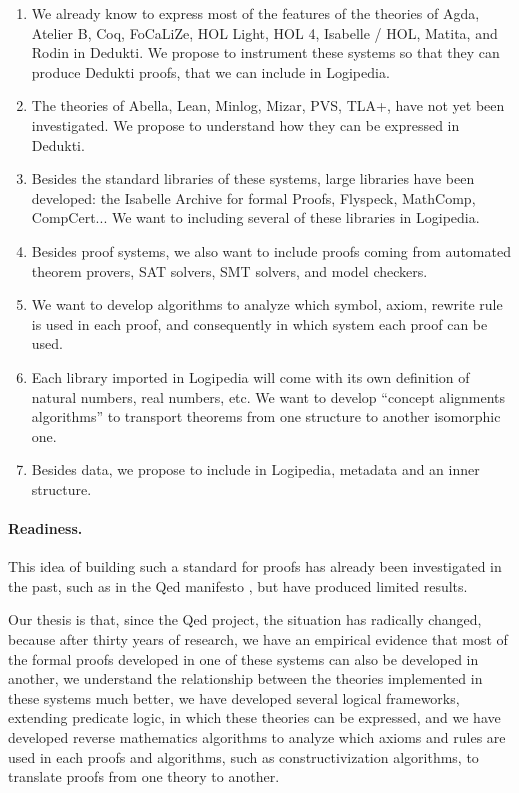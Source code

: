 \begin{enumerate}
\item 
  We already know to express most of the features of the theories of 
  {\sc Agda}, {\sc Atelier B}, {\sc Coq}, {\sc FoCaLiZe}, {\sc HOL Light},
  {\sc HOL 4}, {\sc Isabelle / HOL}, {\sc Matita}, and {\sc Rodin}
  in {\sc Dedukti}. We propose to instrument these systems so that
  they can produce {\sc
 Dedukti} proofs, that we can include in
  {\sc Logipedia}. 

\item
  The theories of {\sc Abella}, {\sc Lean}, {\sc Minlog}, {\sc Mizar},
  {\sc PVS}, {\sc TLA+}, have not yet been investigated. We propose to
  understand how they can be expressed in 
  {\sc Dedukti}. 

\item
  Besides the standard libraries of these systems, large libraries
  have been developed: the 
  Isabelle Archive for formal Proofs, Flyspeck, MathComp, CompCert...
We want to including several of these libraries in {\sc Logipedia}. 
  
\item
  Besides proof systems, we also want to include proofs coming from
  automated theorem provers, SAT solvers, SMT solvers, and model checkers. 

\item
  We want to develop algorithms to analyze which symbol, axiom, rewrite
  rule is used in each proof, and consequently in which system each proof
  can be used.

\item
  Each library imported in {\sc Logipedia} will come with its own
  definition of natural numbers, real numbers, etc. We want to develop
  ``concept alignments algorithms'' to transport theorems from one
  structure to another isomorphic one.

\item 
  Besides data, we propose to include in {\sc Logipedia}, metadata and
  an inner structure.
\end{enumerate}



\paragraph{Readiness.}
This idea of building such a standard for proofs has already been
investigated in the past, such as in the Qed manifesto \cite{Qed94}, but
have produced limited results.

Our thesis is that, since the
Qed project, the situation has radically changed, because after
thirty years of research, we have an empirical evidence that most of
the formal proofs developed in one of these systems can also be
developed in another, we understand the relationship between the
theories implemented in these systems much better, we have developed
several logical frameworks, extending predicate logic, in which these
theories can be expressed, and we have developed reverse mathematics
algorithms to analyze which axioms and rules are used in each proofs
and algorithms, such as constructivization algorithms, to translate
proofs from one theory to another.
